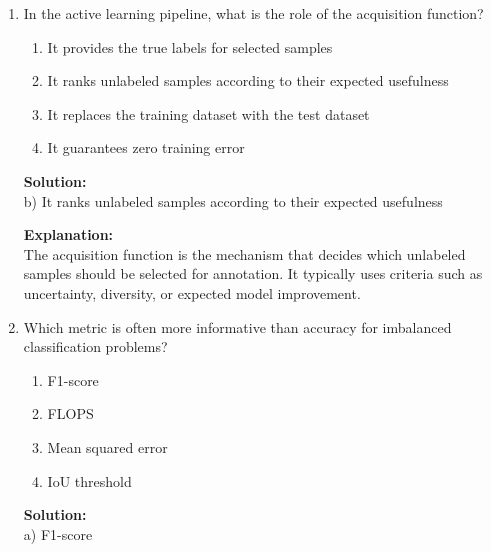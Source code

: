 \documentclass{article}
\begin{document}
\begin{enumerate}
\textbf{Solution:} \\
b) Supervised learning assumes labels are already available, while active learning selectively requests labels during training

\textbf{Explanation:} \\
In supervised learning, the labeled dataset is assumed to be prepared in advance. In active learning, the learner interacts with an unlabeled pool and chooses which samples should be labeled next under a limited budget.

\vspace{1em}

\item In the active learning pipeline, what is the role of the acquisition function?

\begin{enumerate}
    \item It provides the true labels for selected samples
    \item It ranks unlabeled samples according to their expected usefulness
    \item It replaces the training dataset with the test dataset
    \item It guarantees zero training error
\end{enumerate}

\textbf{Solution:} \\
b) It ranks unlabeled samples according to their expected usefulness

\textbf{Explanation:} \\
The acquisition function is the mechanism that decides which unlabeled samples should be selected for annotation. It typically uses criteria such as uncertainty, diversity, or expected model improvement.

\vspace{1em}

\item Which metric is often more informative than accuracy for imbalanced classification problems?

\begin{enumerate}
    \item F1-score
    \item FLOPS
    \item Mean squared error
    \item IoU threshold
\end{enumerate}

\textbf{Solution:} \\
a) F1-score


\end{enumerate}
\end{document}
